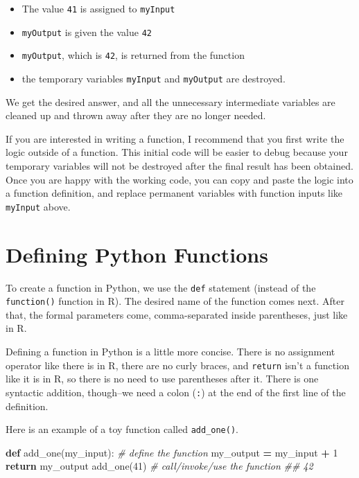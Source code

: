 \documentclass[
  12pt,
  krantz2]{krantz}
\makeatletter
\newenvironment{Shaded}{\begin{snugshade}}{\end{snugshade}}
\newcommand{\CommentTok}[1]{\textcolor[rgb]{0.37,0.37,0.37}{\textit{#1}}}
\newcommand{\ControlFlowTok}[1]{\textcolor[rgb]{0.27,0.27,0.27}{\textbf{#1}}}
\newcommand{\DecValTok}[1]{\textcolor[rgb]{0.06,0.06,0.06}{#1}}
\newcommand{\KeywordTok}[1]{\textcolor[rgb]{0.27,0.27,0.27}{\textbf{#1}}}
\newcommand{\NormalTok}[1]{#1}
\newcommand{\OperatorTok}[1]{\textcolor[rgb]{0.43,0.43,0.43}{\textbf{#1}}}
\providecommand{\tightlist}{%
  \setlength{\itemsep}{0pt}\setlength{\parskip}{0pt}}
\newenvironment{kframe}{%
\medskip{}
\setlength{\fboxsep}{.8em}
 \def\at@end@of@kframe{}%
 \ifinner\ifhmode%
  \def\at@end@of@kframe{\end{minipage}}%
  \begin{minipage}{\columnwidth}%
 \fi\fi%
 \def\FrameCommand##1{\hskip\@totalleftmargin \hskip-\fboxsep
 \colorbox{shadecolor}{##1}\hskip-\fboxsep
     \hskip-\linewidth \hskip-\@totalleftmargin \hskip\columnwidth}%
 \MakeFramed {\advance\hsize-\width
   \@totalleftmargin\z@ \linewidth\hsize
   \@setminipage}}%
 {\par\unskip\endMakeFramed%
 \at@end@of@kframe}
\renewenvironment{Shaded}{\begin{kframe}}{\end{kframe}}
\makeatother
\begin{document}
\begin{itemize}
\tightlist
\item
  The value \texttt{41} is assigned to \texttt{myInput}
\item
  \texttt{myOutput} is given the value \texttt{42}
\item
  \texttt{myOutput}, which is \texttt{42}, is returned from the function
\item
  the temporary variables \texttt{myInput} and \texttt{myOutput} are destroyed.
\end{itemize}

We get the desired answer, and all the unnecessary intermediate variables are cleaned up and thrown away after they are no longer needed.

\begin{rmd-caution}
If you are interested in writing a function, I recommend that you first write the logic outside of a function. This initial code will be easier to debug because your temporary variables will not be destroyed after the final result has been obtained. Once you are happy with the working code, you can copy and paste the logic into a function definition, and replace permanent variables with function inputs like \texttt{myInput} above.

\end{rmd-caution}

\hypertarget{defining-python-functions}{%
\section{Defining Python Functions}\label{defining-python-functions}}

To create a function in Python, we use the \texttt{def} statement (instead of the \texttt{function()} function in R). The desired name of the function comes next. After that, the formal parameters come, comma-separated inside parentheses, just like in R.

Defining a function in Python is a little more concise. There is no assignment operator like there is in R, there are no curly braces, and \texttt{return} isn't a function like it is in R, so there is no need to use parentheses after it. There is one syntactic addition, though--we need a colon (\texttt{:}) at the end of the first line of the definition.

Here is an example of a toy function called \texttt{add\_one()}.

\begin{Shaded}
\begin{Highlighting}[]
\KeywordTok{def}\NormalTok{ add\_one(my\_input):  }\CommentTok{\# define the function}
\NormalTok{    my\_output }\OperatorTok{=}\NormalTok{ my\_input }\OperatorTok{+} \DecValTok{1}
    \ControlFlowTok{return}\NormalTok{ my\_output}
\NormalTok{add\_one(}\DecValTok{41}\NormalTok{) }\CommentTok{\# call/invoke/use the function }
\CommentTok{\#\# 42}
\end{Highlighting}
\end{Shaded}
\end{document}
